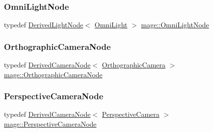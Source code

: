 \hypertarget{namespacemage_a85082c7e15a2bbf19b1753b7de6c45db}{}\label{namespacemage_a85082c7e15a2bbf19b1753b7de6c45db} 
\subsubsection{\texorpdfstring{Omni\+Light\+Node}{OmniLightNode}}
{\footnotesize\ttfamily typedef \hyperlink{classmage_1_1_derived_light_node}{Derived\+Light\+Node}$<$ \hyperlink{classmage_1_1_omni_light}{Omni\+Light} $>$ \hyperlink{namespacemage_a85082c7e15a2bbf19b1753b7de6c45db}{mage\+::\+Omni\+Light\+Node}}

\hypertarget{namespacemage_a2ba71e84d4a4fb1e4a7160800c53f519}{}\label{namespacemage_a2ba71e84d4a4fb1e4a7160800c53f519} 
\subsubsection{\texorpdfstring{Orthographic\+Camera\+Node}{OrthographicCameraNode}}
{\footnotesize\ttfamily typedef \hyperlink{classmage_1_1_derived_camera_node}{Derived\+Camera\+Node}$<$ \hyperlink{classmage_1_1_orthographic_camera}{Orthographic\+Camera} $>$ \hyperlink{namespacemage_a2ba71e84d4a4fb1e4a7160800c53f519}{mage\+::\+Orthographic\+Camera\+Node}}

\hypertarget{namespacemage_af3a338f28772b91cf6d7cb85df6f4bb9}{}\label{namespacemage_af3a338f28772b91cf6d7cb85df6f4bb9} 
\subsubsection{\texorpdfstring{Perspective\+Camera\+Node}{PerspectiveCameraNode}}
{\footnotesize\ttfamily typedef \hyperlink{classmage_1_1_derived_camera_node}{Derived\+Camera\+Node}$<$ \hyperlink{classmage_1_1_perspective_camera}{Perspective\+Camera} $>$ \hyperlink{namespacemage_af3a338f28772b91cf6d7cb85df6f4bb9}{mage\+::\+Perspective\+Camera\+Node}}

\hypertarget{namespacemage_a0b0a087ad59dd4aa0b4b538d8caec216}{}\label{namespacemage_a0b0a087ad59dd4aa0b4b538d8caec216} 
